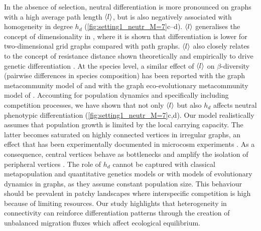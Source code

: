 In the absence of selection, neutral differentiation is more pronounced on graphs with a high average path length $\langle l \rangle$, but is also negatively associated with homogeneity in degree $h_d$ (\cref{fig:setting1_neutr_M=7}c--d).
%
$\langle l \rangle$ generalises the concept of dimensionality in \cite{Kimura1964,Lande1991,Nagylaki1994}, where it is shown that differentiation is lower for two-dimensional grid graphs compared with path graphs. $\langle l \rangle$ also closely relates to the concept of resistance distance shown theoretically and empirically to drive genetic differentiation \cite{McRae2006,McRae2007}.
%
At the species level, a similar effect of $\langle l \rangle$ on $\beta$-diversity (pairwise differences in species composition) has been reported with the graph metacommunity model of \cite{Carrara2012} and with the graph eco-evolutionary metacommunity model of \cite{Economo2007}.
%
Accounting for population dynamics and specifically including competition processes, we have shown that not only $\langle l \rangle$ but also $h_d$ affects neutral phenotypic differentiation (\cref{fig:setting1_neutr_M=7}c,d).
%
Our model realistically assumes that population growth is limited by the local carrying capacity. The latter becomes saturated on highly connected vertices in irregular graphs, an effect that has been experimentally documented in microcosm experiments \cite{Altermatt2018}. As a consequence, central vertices behave as bottlenecks and amplify the isolation of peripheral vertices \cite{Orsini2013}.
%
The role of $h_d$ cannot be captured with classical metapopulation and quantitative genetics models or with models of evolutionary dynamics in graphs, as they assume constant population size.
% 
This behaviour should be prevalent in patchy landscapes where interspecific competition is high because of limiting resources.
%
Our study highlights that heterogeneity in connectivity can reinforce differentiation patterns through the creation of unbalanced migration fluxes which affect ecological equilibrium.

